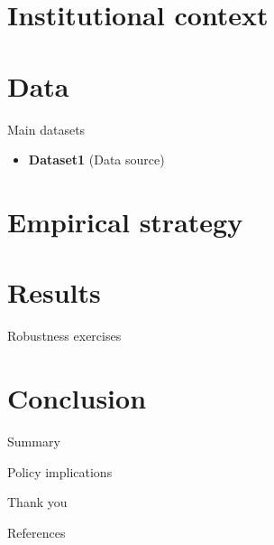 \documentclass[
  ignorenonframetext,
  aspectratio=169]{beamer}
\providecommand{\tightlist}{%
  \setlength{\itemsep}{0pt}\setlength{\parskip}{0pt}}
\newlength{\cslhangindent}
\newlength{\cslentryspacingunit} %
\newenvironment{CSLReferences}[2] %
 {%
  \setlength{\parindent}{0pt}
  \ifodd #1
  \let\oldpar\par
  \def\par{\hangindent=\cslhangindent\oldpar}
  \fi
  \setlength{\parskip}{#2\cslentryspacingunit}
 }%
 {}
\newcommand{\backupend}{
   \setcounter{framenumber}{\value{finalframe}}
}
\begin{document}
\hypertarget{institutional-context}{%
\section{Institutional context}\label{institutional-context}}

\hypertarget{data}{%
\section{Data}\label{data}}

\begin{frame}{Main datasets}
\protect\hypertarget{main-datasets}{}
\begin{itemize}
\tightlist
\item
  \textbf{Dataset1} (Data source)
\end{itemize}
\end{frame}

\hypertarget{empirical-strategy}{%
\section{Empirical strategy}\label{empirical-strategy}}

\hypertarget{results}{%
\section{Results}\label{results}}

\begin{frame}{Robustness exercises}
\protect\hypertarget{robustness-exercises}{}
\label{robustness}
\end{frame}

\hypertarget{conclusion}{%
\section{Conclusion}\label{conclusion}}

\begin{frame}{Summary}
\protect\hypertarget{summary}{}
\label{conclusion}
\end{frame}

\begin{frame}{Policy implications}
\protect\hypertarget{policy-implications}{}
\setcounter{finalframe}{\value{framenumber}}
\end{frame}

\begin{frame}[plain]
\begin{center}
\Large Thank you
\end{center}
\end{frame}

\appendix
\begin{frame}[allowframebreaks]{References}

\tiny

\hypertarget{refs}{}
\begin{CSLReferences}{0}{0}
\end{CSLReferences}

\backupend
\end{frame}
\end{document}
